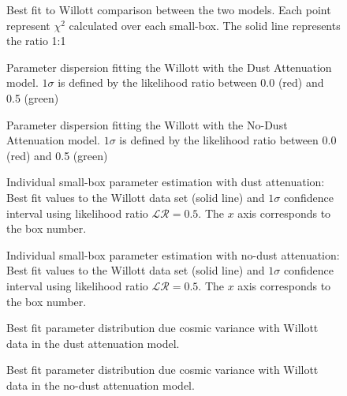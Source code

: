 \documentclass{emulateapj}
\begin{document}
\begin{figure}
\caption{Best fit to Willott comparison between the two models. Each point represent $\chi^2$ 
calculated over each small-box. The solid line represents the ratio 1:1 }
\label{fig:OD1_chi2_comparison}
\end{figure}

\begin{figure*}
\caption{Parameter dispersion fitting the Willott with the Dust Attenuation model. 
$1\sigma$ is defined by the likelihood ratio between 0.0 (red) and 0.5 (green)}
\label{}
\end{figure*}

\begin{figure*}
\caption{Parameter dispersion fitting the Willott with the No-Dust Attenuation model. 
$1\sigma$ is defined by the likelihood ratio between 0.0 (red) and 0.5 (green)}
\label{}
\end{figure*}





\begin{figure}
\caption{Individual small-box parameter estimation with dust attenuation: Best fit values 
to the Willott data set
(solid line) and $1\sigma$ confidence interval using likelihood ratio $\mathcal{LR}= 0.5$. 
The $x$ axis corresponds to the box number.}
\label{}
\end{figure}


\begin{figure}
\caption{Individual small-box parameter estimation with no-dust attenuation: Best fit values 
to the Willott data set
(solid line) and $1\sigma$ confidence interval using likelihood ratio $\mathcal{LR}= 0.5$. 
The $x$ axis corresponds to the box number.}
\label{}
\end{figure}


\begin{figure}
\caption{Best fit parameter distribution due cosmic variance with Willott data in the dust
 attenuation model.}
\label{}
\end{figure}


\begin{figure}
\caption{Best fit parameter distribution due cosmic variance with Willott data in the no-dust
 attenuation model.}
\label{}
\end{figure}
\end{document}
